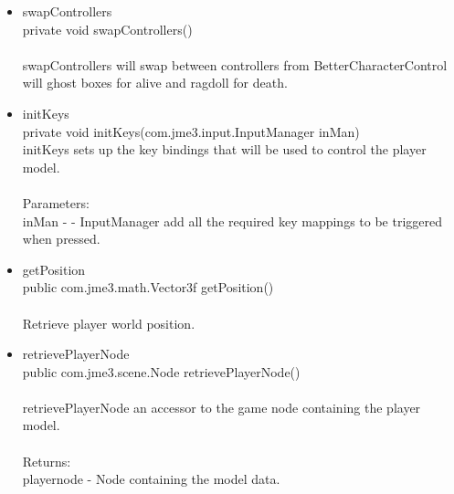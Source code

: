 \documentclass[letterpaper]{article}
\begin{document}
\begin{itemize}
\begin{itemize}
									\item	swapControllers \\
											private void swapControllers() \\ \\
											swapControllers will swap between controllers from BetterCharacterControl will ghost boxes for alive and ragdoll for death. \\
									\item	initKeys \\
											private void initKeys(com.jme3.input.InputManager inMan) \\
											initKeys sets up the key bindings that will be used to control the player model. \\ \\
											Parameters: \\
											inMan - - InputManager add all the required key mappings to be triggered when pressed.
									\item	getPosition \\
											public com.jme3.math.Vector3f getPosition() \\ \\
											Retrieve player world position.
									\item	retrievePlayerNode \\
											public com.jme3.scene.Node retrievePlayerNode() \\ \\
											retrievePlayerNode an accessor to the game node containing the player model. \\ \\
											Returns: \\
											playernode - Node containing the model data.
								\end{itemize}
					\end{itemize}
				
				\vspace{0.2in}
\end{document}
